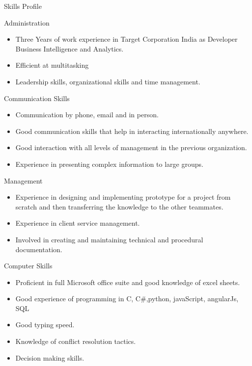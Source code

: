 \documentclass[]{nakulcv}
\begin{document}
	\makeheader
	
	\begin{cvsection}{Skills Profile}
		\begin{cvsubsection}{Administration}{}{}
			\begin{itemize}
				\item Three Years of work experience in Target Corporation India as Developer Business Intelligence and Analytics.
				\item Efficient at multitasking
				\item Leadership skills, organizational skills and time management.
			\end{itemize}
		\end{cvsubsection}
		\begin{cvsubsection}{Communication Skills}{}{}
			\begin{itemize}
				\item Communication by phone, email and in person.
				\item Good communication skills that help in interacting internationally anywhere.
				\item Good interaction with all levels of management in the previous organization.
				\item Experience in presenting complex information to large groups. 
			\end{itemize}
		\end{cvsubsection}
		\begin{cvsubsection}{Management}{}{}
			\begin{itemize}
				\item Experience in designing and implementing prototype for a project from scratch and then transferring the knowledge to the other teammates.
				\item Experience in client service management.
				\item Involved in creating and maintaining technical and procedural documentation.
			\end{itemize}
		\end{cvsubsection}
		\begin{cvsubsection}{Computer Skills}{}{}
			\begin{itemize}
				\item Proficient in full Microsoft office suite and good knowledge of excel sheets.
				\item Good experience of programming in C, C\#,python, javaScript, angularJs, SQL
				\item Good typing speed.
				\item Knowledge of conflict resolution tactics.
				\item Decision making skills.
			\end{itemize}
		\end{cvsubsection}
	\end{cvsection}
\end{document}
